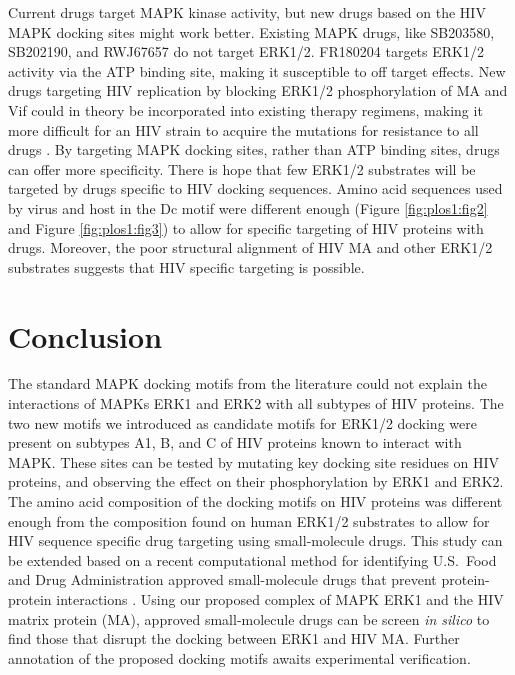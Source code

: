 Current drugs target MAPK kinase activity, but new drugs based on the
HIV MAPK docking sites might work better. Existing MAPK drugs, like
SB203580, SB202190, and RWJ67657 do not target ERK1/2. FR180204
targets ERK1/2 activity via the ATP binding site, making it
susceptible to off target effects. New drugs targeting HIV replication
by blocking ERK1/2 phosphorylation of MA and Vif could in theory be
incorporated into existing therapy regimens, making it more difficult
for an HIV strain to acquire the mutations for resistance to all drugs
\cite{deeks03}. By targeting MAPK docking sites, rather than ATP
binding sites, drugs can offer more specificity. There is hope that
few ERK1/2 substrates will be targeted by drugs specific to HIV
docking sequences. Amino acid sequences used by virus and host in the
Dc motif were different enough (Figure \ref{fig:plos1:fig2} and Figure
\ref{fig:plos1:fig3}) to allow for specific targeting of HIV proteins
with drugs. Moreover, the poor structural alignment of HIV MA and
other ERK1/2 substrates suggests that HIV specific targeting is
possible.

\section{Conclusion}

The standard MAPK docking motifs from the literature could not explain
the interactions of MAPKs ERK1 and ERK2 with all subtypes of HIV
proteins. The two new motifs we introduced as candidate motifs for
ERK1/2 docking were present on subtypes A1, B, and C of HIV proteins
known to interact with MAPK. These sites can be tested by mutating key
docking site residues on HIV proteins, and observing the effect on
their phosphorylation by ERK1 and ERK2. The amino acid composition of
the docking motifs on HIV proteins was different enough from the
composition found on human ERK1/2 substrates to allow for HIV sequence
specific drug targeting using small-molecule drugs. This study can be
extended based on a recent computational method for identifying
U.S.\ Food and Drug Administration approved small-molecule drugs that
prevent protein-protein interactions
\cite{parthasarathi2008approved}. Using our proposed complex of MAPK
ERK1 and the HIV matrix protein (MA), approved small-molecule drugs
can be screen \textit{in silico} to find those that disrupt the docking between
ERK1 and HIV MA. Further annotation of the proposed docking motifs
awaits experimental verification.

